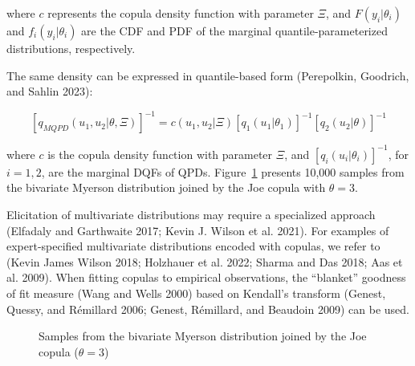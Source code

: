 \documentclass[
]{interact}
\begin{document}
where \(c\) represents the copula density function with parameter
\(\Xi\), and \(F(y_i\vert\theta_i)\) and \(f_i(y_i\vert\theta_i)\) are
the CDF and PDF of the marginal quantile-parameterized distributions,
respectively.

The same density can be expressed in quantile-based form (Perepolkin,
Goodrich, and Sahlin 2023):

\[
[q_{MQPD}(u_1,u_2\vert\theta, \Xi)]^{-1}=c\left(u_1,u_2\vert\Xi\right)[q_1(u_1\vert\theta_1)]^{-1}[q_2(u_2\vert\theta)]^{-1}
\]

where \(c\) is the copula density function with parameter \(\Xi\), and
\([q_i(u_i\vert\theta_i)]^{-1}\), for \(i=1,2\), are the marginal DQFs
of QPDs. Figure~\ref{fig-bc-myerson} presents 10,000 samples from the
bivariate Myerson distribution joined by the Joe copula with
\(\theta=3\).

Elicitation of multivariate distributions may require a specialized
approach (Elfadaly and Garthwaite 2017; Kevin J. Wilson et al. 2021).
For examples of expert-specified multivariate distributions encoded with
copulas, we refer to (Kevin James Wilson 2018; Holzhauer et al. 2022;
Sharma and Das 2018; Aas et al. 2009). When fitting copulas to empirical
observations, the ``blanket'' goodness of fit measure (Wang and Wells
2000) based on Kendall's transform (Genest, Quessy, and Rémillard 2006;
Genest, Rémillard, and Beaudoin 2009) can be used.

\begin{figure}


\caption{\label{fig-bc-myerson}Samples from the bivariate Myerson
distribution joined by the Joe copula (\(\theta=3\))}

\end{figure}%
\end{document}
